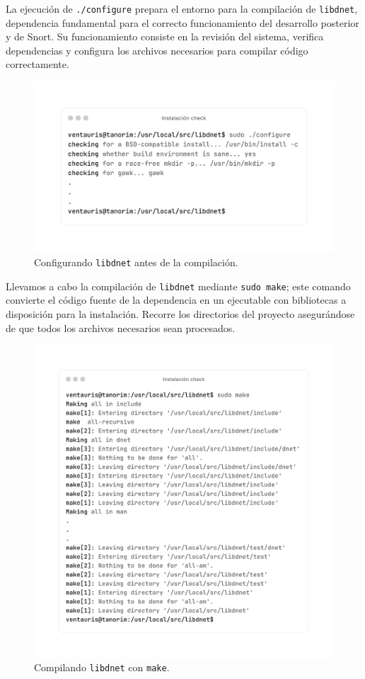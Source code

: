 \documentclass[11pt,a4paper,twoside]{report}
\begin{document}
La ejecución de \texttt{./configure} prepara el entorno para la compilación de \texttt{libdnet}, dependencia fundamental para el correcto funcionamiento del desarrollo posterior y de Snort. Su funcionamiento consiste en la revisión del sistema, verifica dependencias y configura los archivos necesarios para compilar código correctamente.

\begin{figure}[H]
	\centering
	\includegraphics[scale=0.12]{instalacion_snort/3-3.png}
	\caption{Configurando \texttt{libdnet} antes de la compilación.}
\end{figure}

\newpage

Llevamos a cabo la compilación de \texttt{libdnet} mediante \texttt{sudo make}; este comando convierte el código fuente de la dependencia en un ejecutable con bibliotecas a disposición para la instalación. Recorre los directorios del proyecto asegurándose de que todos los archivos necesarios sean procesados.

\begin{figure}[H]
	\centering
	\includegraphics[scale=0.12]{instalacion_snort/4-4.png}
	\caption{Compilando \texttt{libdnet} con \texttt{make}.}
\end{figure}
\end{document}
